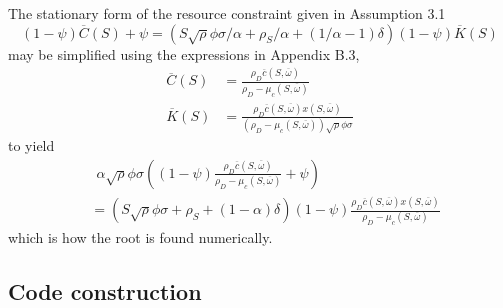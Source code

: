 \documentclass[11pt]{article}
\theoremstyle{plain}
\theoremstyle{definition} %
\begin{document}
The stationary form of the resource constraint given in Assumption 3.1
\begin{equation}
(1-\psi)\overline{C}(S) + \psi = {\left(S\sqrt{\rho}\phi \sigma/\alpha + \rho_S/\alpha + (1/\alpha-1)\delta \right)}(1-\psi)\overline{K}(S)
\label{statRCpsi}
\end{equation}
may be simplified using the expressions in Appendix B.3, 
\begin{equation}
\begin{aligned} 
\overline{C}(S) & = \frac{\rho_D\overline{c}(S, \overline{\omega})}{\rho_D - \mu_c(S,\overline{\omega})} 
\\ \overline{K}(S) & = \frac{\rho_D\overline{c}(S, \overline{\omega})x(S, \overline{\omega})}{(\rho_D - \mu_c(S,\overline{\omega}))\sqrt{\rho}\phi \sigma} 
\end{aligned}
\label{bigCK}
\end{equation}
to yield
\begin{equation}
\begin{aligned}
& \ \ \alpha \sqrt{\rho}\phi \sigma{\left((1-\psi)\frac{\rho_D\overline{c}(S, \overline{\omega})}{\rho_D - \mu_c(S,\overline{\omega})} + \psi\right)}
\\ & = {\left(S\sqrt{\rho}\phi \sigma + \rho_S + (1 - \alpha) \delta \right)}(1-\psi)\frac{\rho_D\overline{c}(S, \overline{\omega})x(S, \overline{\omega})}{\rho_D - \mu_c(S,\overline{\omega})}
\label{statRCpsi2}
\end{aligned}
\end{equation}
which is how the root is found numerically. 


\subsection*{Code construction}
\end{document}
